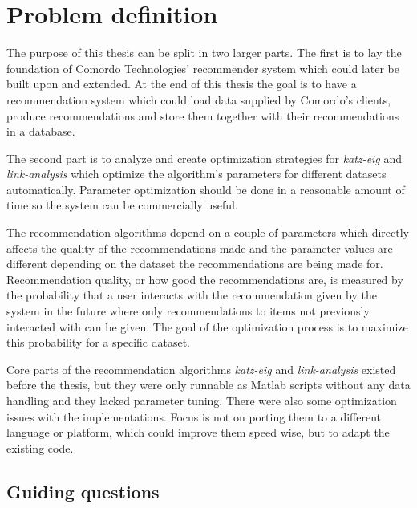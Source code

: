 
\section{Problem definition}\label{sec:intro:problem}

The purpose of this thesis can be split in two larger parts. The first is to lay the foundation of Comordo Technologies' recommender system which could later be built upon and extended. At the end of this thesis the goal is to have a recommendation system which could load data supplied by Comordo's clients, produce recommendations and store them together with their recommendations in a database.

The second part is to analyze and create optimization strategies for \textit{katz-eig} and \textit{link-analysis} which optimize the algorithm's parameters for different datasets automatically. Parameter optimization should be done in a reasonable amount of time so the system can be commercially useful.

The recommendation algorithms depend on a couple of parameters which directly affects the quality of the recommendations made and the parameter values are different depending on the dataset the recommendations are being made for.  Recommendation quality, or how good the recommendations are, is measured by the probability that a user interacts with the recommendation given by the system in the future where only recommendations to items not previously interacted with can be given. The goal of the optimization process is to maximize this probability for a specific dataset.

Core parts of the recommendation algorithms \textit{katz-eig} and \textit{link-analysis} existed before the thesis, but they were only runnable as Matlab scripts without any data handling and they lacked parameter tuning. There were also some optimization issues with the implementations. Focus is not on porting them to a different language or platform, which could improve them speed wise, but to adapt the existing code.

\newpage
\subsection{Guiding questions}\label{sec:intro:questions}

